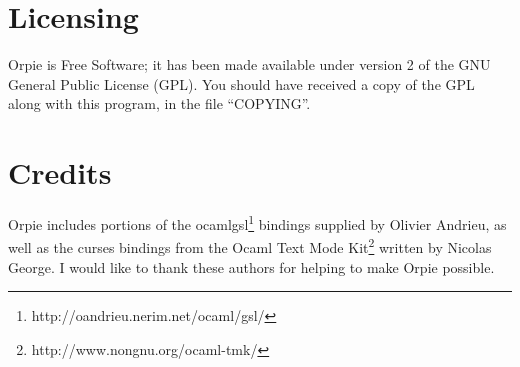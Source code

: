 \documentclass[11pt,notitlepage]{article}
\begin{document}
\section{Licensing}
Orpie is Free Software; it has been made available under version 2 of the GNU
General Public License (GPL).  You should have received a copy of the GPL along
with this program, in the file ``COPYING''.


\section{Credits}
Orpie includes portions of the
ocamlgsl\footnote{http://oandrieu.nerim.net/ocaml/gsl/} bindings supplied by
Olivier Andrieu, as well as the curses bindings from the Ocaml Text Mode
Kit\footnote{http://www.nongnu.org/ocaml-tmk/} written by Nicolas George.  I
would like to thank these authors for helping to make Orpie possible.
\end{document}
